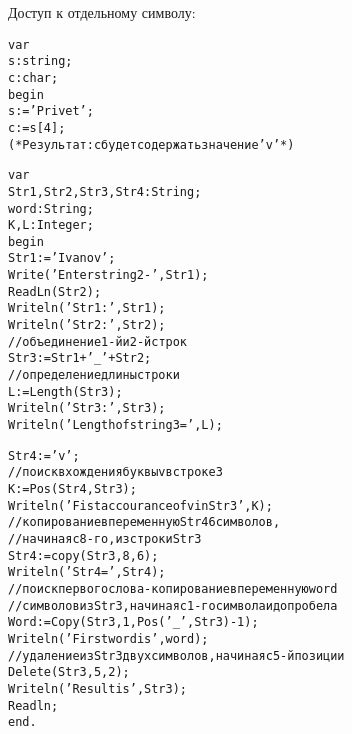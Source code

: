 \documentclass{beamer}
\begin{document}
\begin{frame}[fragile]
Доступ к отдельному символу: 
\begin{alltt}
var 
  s : string; 
  c : char;
begin
  s:= ’ Privet ’ ;
  c:= s[4] ;
(* Результат: c будет содержать значение 'v' *)
\end{alltt}
\end{frame}  

\begin{frame}[fragile]
\begin{alltt}
var
  Str1, Str2, Str3, Str4: String;
  word : String ;
  K, L : Integer ;
begin
  Str1:= 'Ivanov';
  Write('Enter string 2 -', Str1);
  ReadLn(Str2);
  Writeln('Str1: ', Str1);
  Writeln('Str2: ', Str2);
  //объединение 1-й и 2-й строк
  Str3 := Str1 + '_' + Str2;
  //определение длины строки
  L:= Length(Str3) ;
  Writeln('Str3: ', Str3) ;
  Writeln('Length of string 3 =', L);
\end{alltt}
\end{frame}

\begin{frame}[fragile]
\begin{alltt}
  Str4 := 'v';
  //поиск вхождения буквы v в строке 3
  K := Pos(Str4, Str3);
  Writeln('Fist accourance of v in Str3' ,K) ;
  //копирование в переменную Str4 6 символов, 
  //начиная с 8-го, из строки Str3
  Str4 :=copy(Str3, 8, 6);
  Writeln('Str4=', Str4) ;
  //поиск первого слова - копирование в переменную word 
  //символов из Str3, начиная с 1-го символа и до пробела
  Word := Copy(Str3, 1, Pos('_', Str3)-1);
  Writeln('First word is ' ,word) ;
  //удаление из Str3 двух символов, начиная с 5-й позиции
  Delete(Str3, 5, 2);
  Writeln('Result is ’, Str3) ;
  Readln;
end.
\end{alltt}
\end{frame}

\end{document}
